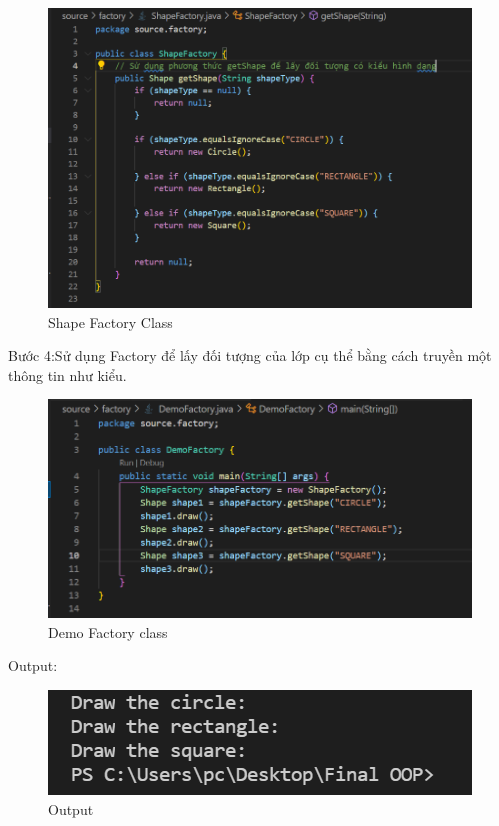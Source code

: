 \begin{figure}[!htb]
    \centering
    \includegraphics[width=\textwidth]{fig/Factory/shape_factory_class.png}
    \caption{Shape Factory Class}
    \label{fig:shape_factory_class}
\end{figure}

Bước 4:Sử dụng Factory để lấy đối tượng của lớp cụ thể bằng cách truyền một thông tin như kiểu.

\begin{figure}[!htb]
    \centering
    \includegraphics[width=\textwidth]{fig/Factory/demo_factory_class.png}
    \caption{Demo Factory class}
    \label{fig:demo_factory_class}
\end{figure}

\newpage
Output:
\begin{figure}[!htb]
    \centering
    \includegraphics[width=\textwidth]{fig/Factory/factory_output.png}
    \caption{Output}
    \label{fig:factory_output}
\end{figure}

